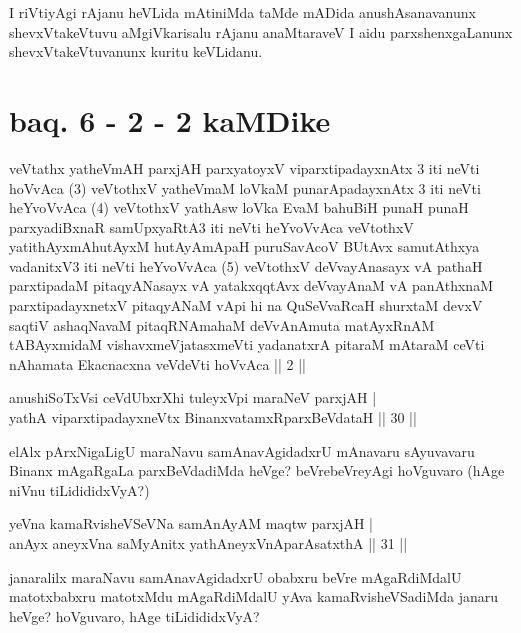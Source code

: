 \begin{artha}
I riVtiyAgi rAjanu heVLida mAtiniMda taMde mADida anushAsanavanunx 
shevxVtakeVtuvu aMgiVkarisalu rAjanu anaMtaraveV I aidu 
parxshenxgaLanunx shevxVtakeVtuvanunx kuritu keVLidanu.
\end{artha}

\section*{baq. 6 - 2 - 2 kaMDike}

\begin{shl}
veVtathx yatheVmAH parxjAH parxyatoyxV viparxtipadayxnAtx 3 iti neVti hoVvAca (3) veVtothxV yatheVmaM loVkaM punarApadayxnAtx 3 iti neVti heYvoVvAca (4) veVtothxV yathAsw loVka EvaM bahuBiH punaH punaH parxyadiBxnaR samUpxyaRtA3 iti neVti heYvoVvAca veVtothxV yatithAyxmAhutAyxM hutAyAmApaH puruSavAcoV BUtAvx samutAthxya vadanitxV3 iti neVti heYvoVvAca (5) veVtothxV deVvayAnasayx vA pathaH parxtipadaM pitaqyANasayx vA yatakxqqtAvx deVvayAnaM vA panAthxnaM parxtipadayxnetxV pitaqyANaM vApi hi na QuSeVvaRcaH shurxtaM devxV saqtiV ashaqNavaM pitaqRNAmahaM deVvAnAmuta matAyxRnAM tABAyxmidaM vishavxmeVjatasxmeVti yadanatxrA pitaraM mAtaraM ceVti nAhamata Ekacnacxna veVdeVti hoVvAca || 2 ||
\end{shl}


\begin{shl}
anushiSoTxV\s si ceVdUbxrXhi tuleyxV\s pi maraNeV parxjAH | \\
yathA viparxtipadayxneVtx BinanxvatamxRparxBeVdataH \hfill|| 30 || 
\end{shl}

\begin{artha}
elAlx pArxNigaLigU maraNavu samAnavAgidadxrU mAnavaru sAyuvavaru 
Binanx mAgaRgaLa parxBeVdadiMda heVge? beVrebeVreyAgi hoVguvaro (hAge 
niVnu tiLidididxVyA?)
\end{artha}


\begin{shl}
yeVna kamaRvisheVSeVNa samAnAyAM maqtw parxjAH | \\
anAyx aneyxVna saMyAnitx yathA\s neyxVnAparAsatxthA \hfill|| 31 || 
\end{shl}

\begin{artha}
janaralilx maraNavu samAnavAgidadxrU obabxru beVre mAgaRdiMdalU 
matotxbabxru matotxMdu mAgaRdiMdalU yAva kamaRvisheVSadiMda janaru 
heVge? hoVguvaro, hAge tiLidididxVyA?
\end{artha}

